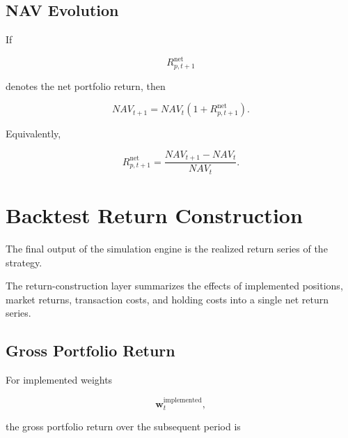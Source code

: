 \documentclass[11pt,a4paper]{article}
\begin{document}
\subsection{NAV Evolution}

If

\begin{equation}
R_{p,t+1}^{\mathrm{net}}
\end{equation}

denotes the net portfolio return, then

\begin{equation}
\boxed{
NAV_{t+1}
=
NAV_t
\left(
1+
R_{p,t+1}^{\mathrm{net}}
\right).
}
\end{equation}

Equivalently,

\begin{equation}
\boxed{
R_{p,t+1}^{\mathrm{net}}
=
\frac{
NAV_{t+1}
-
NAV_t
}{
NAV_t
}.
}
\end{equation}


\section{Backtest Return Construction}
\label{sec:backtest_return_construction}

The final output of the simulation engine is the realized return series of the
strategy.

The return-construction layer summarizes the effects of implemented positions,
market returns, transaction costs, and holding costs into a single net return
series.


\subsection{Gross Portfolio Return}

For implemented weights

\begin{equation}
\mathbf{w}_t^{\mathrm{implemented}},
\end{equation}

the gross portfolio return over the subsequent period is
\end{document}
